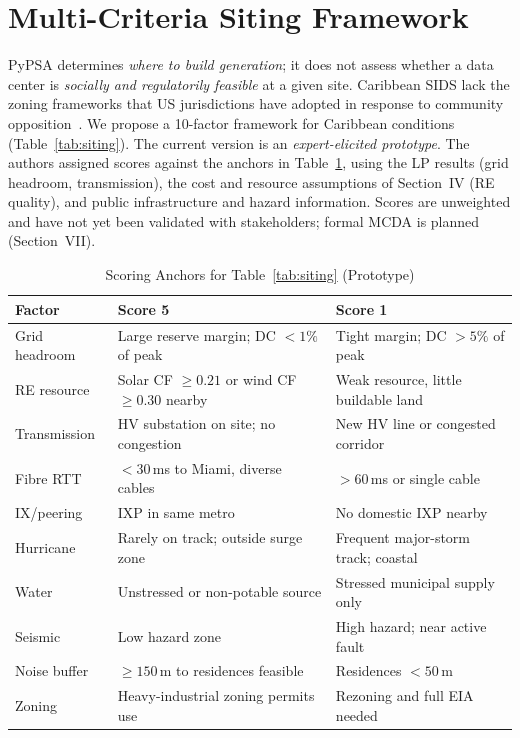 \documentclass[conference,10pt]{IEEEtran}
\begin{document}
\section{Multi-Criteria Siting Framework}

PyPSA determines \emph{where to build generation}; it does not assess whether a data center is \emph{socially and regulatorily feasible} at a given site. Caribbean SIDS lack the zoning frameworks that US jurisdictions have adopted in response to community opposition~\cite{dcwatch2025,stafford2025,albemarle2025,ramboll2024}. We propose a 10-factor framework for Caribbean conditions (Table~\ref{tab:siting}). The current version is an \emph{expert-elicited prototype}. The authors assigned scores against the anchors in Table~\ref{tab:rubric}, using the LP results (grid headroom, transmission), the cost and resource assumptions of Section~IV (RE quality), and public infrastructure and hazard information. Scores are unweighted and have not yet been validated with stakeholders; formal MCDA is planned (Section~VII).

\begin{table}[htbp]
\centering
\caption{Scoring Anchors for Table~\ref{tab:siting} (Prototype)}
\label{tab:rubric}
\scriptsize
\setlength{\tabcolsep}{2pt}
\begin{tabular}{@{}p{1.9cm}p{3.1cm}p{3.1cm}@{}}
\toprule
Factor & Score 5 & Score 1 \\
\midrule
Grid headroom & Large reserve margin; DC ${<}1\%$ of peak & Tight margin; DC ${>}5\%$ of peak \\
RE resource & Solar CF ${\geq}0.21$ or wind CF ${\geq}0.30$ nearby & Weak resource, little buildable land \\
Transmission & HV substation on site; no congestion & New HV line or congested corridor \\
Fibre RTT & ${<}30$\,ms to Miami, diverse cables & ${>}60$\,ms or single cable \\
IX/peering & IXP in same metro & No domestic IXP nearby \\
Hurricane & Rarely on track; outside surge zone & Frequent major-storm track; coastal \\
Water & Unstressed or non-potable source & Stressed municipal supply only \\
Seismic & Low hazard zone & High hazard; near active fault \\
Noise buffer & ${\geq}150$\,m to residences feasible & Residences ${<}50$\,m \\
Zoning & Heavy-industrial zoning permits use & Rezoning and full EIA needed \\
\bottomrule
\end{tabular}
\end{table}
\end{document}

